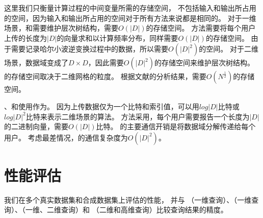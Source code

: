这里我们只衡量计算过程的中间变量所需的存储空间，
不包括输入和输出所占用的空间，因为输入和输出所占用的空间对于所有方法来说都是相同的。
对于一维场景，\myahead 和\myhio 需要维护层次树结构，需要$O(|D|)$的存储空间。
\mycalm 方法需要将每个用户上传的长度为$|D|$的向量求和以计算频率分布，同样需要$O(|D|)$的存储空间。
由于\mydht 需要记录哈尔小波逆变换过程中的数据，所以需要$O(|D|^2)$的空间。
对于二维场景，数据域变成了$D \times D$，因此\myahead 需要$O(|D|^2)$的存储空间来维护层次树结构。
\myHDG 的存储空间取决于二维网格的粒度。
根据文献{\rm\parencite{yang2020answering}}的分析结果，\myHDG 需要$O(N^\frac{1}{2})$的存储空间。


\myhio 、\mydht 和\myHDG 使用\olh \cite{wang2017locally}作为\fo 。
因为\olh 上传数据仅为一个比特和索引值，可以用$log|D|$比特或$log|D|^2$比特来表示二维场景的\myHDG 算法。 
\mycalm 方法采用\oue ，每个用户需要报告一个长度为$|D|$的二进制向量，需要$O(|D|)$比特。
\myahead 的主要通信开销是将数据域分解传递给每个用户。
考虑最差情况，\myahead 的通信复杂度为$O(|D|^2)$。




\section{性能评估}
\label{Evaluation}
我们在多个真实数据集和合成数据集上评估\myahead 的性能，
并与 \myhio \cite{wang2019answering}（一维查询）、\mydht \cite{cormode2019answering}（一维查询）、\mycalm \cite{zhang2018calm}（一维、二维查询）和 \myHDG \cite{yang2020answering}（二维和高维查询）比较查询结果的精度。

